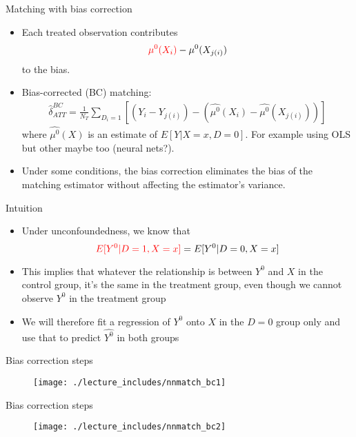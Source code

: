 \documentclass{beamer}
\begin{document}
 
\begin{frame}{Matching with bias correction}
	
	\begin{itemize}
	\item Each treated observation contributes$$\textcolor{red}{\mu^0(X_i)} - \mu^0(X_{j(i)})$$to the bias.
	\item Bias-corrected (BC) matching:
		\begin{eqnarray*}
		\widehat{\delta}_{ATT}^{BC} = \frac{1}{N_T} \sum_{D_i=1} \left[ (Y_i - Y_{j(i)}) - ( \widehat{\mu^0}(X_i) - \widehat{\mu^0}(X_{j(i)}) ) \right]
		\end{eqnarray*}where $\widehat{\mu^0}(X)$ is an estimate of $E[Y|X=x,D=0]$.  For example using OLS but other maybe too (neural nets?).  
	\item Under some conditions, the bias correction eliminates the bias of the matching estimator without affecting the estimator's variance.
	\end{itemize}
\end{frame}

\begin{frame}{Intuition}

\begin{itemize}
\item Under unconfoundedness, we know that $$\textcolor{red}{E[Y^0|D=1, X=x]} = E[Y^0|D=0, X=x]$$
\item This implies that whatever the relationship is between $Y^0$ and $X$ in the control group, it's the same in the treatment group, even though we cannot observe $Y^0$ in the treatment group
\item We will therefore fit a regression of $Y^0$ onto $X$ in the $D=0$ group only and use that to predict $\widehat{Y^0}$ in both groups
\end{itemize}

\end{frame}

\begin{frame}{Bias correction steps}

\begin{figure}[!t]\centering
\texttt{[image: ./lecture\_includes/nnmatch\_bc1]}
\end{figure}

\end{frame}



\begin{frame}{Bias correction steps}

\begin{figure}[!t]\centering
\texttt{[image: ./lecture\_includes/nnmatch\_bc2]}
\end{figure}

\end{frame}
\end{document}
